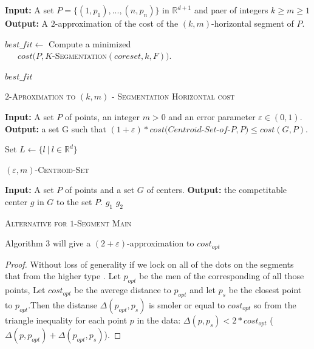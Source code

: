 \documentclass{vldb}
\begin{document}
\begin{algorithm}
\begin{algorithmic}
\STATE \textbf{Input:} A set $P = \lbrace(1,p_1),...,(n,p_n)\rbrace$ in $ \mathbb{R}^{d+1}$
and paer of integers $k\geq m\geq1$
\STATE \textbf{Output:} A $2$-approximation of the cost of the $(k,m)$-horizontal segment of $P$.
 
\STATE $best\_fit \gets $ Compute a minimized\\ \ \ \  $cost(P,$\textsc{$K$-Segmentation$(coreset,k,F)$}$)$.

\ENDFOR

\RETURN $best\_fit$



\caption{\textsc{$2$-Aproximation to $(k,m)$ - Segmentation Horizontal cost}}



\end{algorithmic}
\end{algorithm}
\begin{algorithm}
\begin{algorithmic}
\label{algthree}
\STATE \textbf{Input:} A set $P$ of points, an integer $m>0$ and an error parameter $\varepsilon\in (0,1)$. 
\STATE \textbf{Output:} a set G such that $(1+\varepsilon)*cost(Centroid$-$Set$-$of$-$P,P) \leq cost(G,P)$.

Set $L\gets \lbrace l\ \vert\ l \in \mathbb{R}^{d}     \rbrace$

\caption{\textsc{$(\varepsilon,m)$-Centroid-Set}}

\end{algorithmic}
\end{algorithm}


\begin{algorithm}
\begin{algorithmic}
\STATE \textbf{Input:} A set $P$ of points and a set $G$ of centers. 
\STATE \textbf{Output:} the competitable center $g$ in $G$ to the set $P$.
\RETURN $g_1$
\ELSE
\RETURN $g_2$
\ENDIF 

\caption{\textsc{Alternative for $1$-Segment Main}}

\end{algorithmic}
\end{algorithm}
\newtheorem{A}{Theorem}
\begin{theorem}
Algorithm 3 will give a 
$(2+\varepsilon)$-approximation to $cost_{opt}$


\end{theorem}
\begin{proof}
Without loss of generality
if we lock on all of the dots on the segments that from the higher type .
Let $p_{opt}$ be the men of the corresponding of all those points, Let $cost_{opt}$ be the averege distance to $p_{opt}$ and let $p_{s}$ be the closest point to $p_{opt}$.Then the distanse $\Delta(p_{opt},p_s)$ is smoler or equal to $cost_{opt}$ so from the triangle inequality for each point $p$ in the data: $\Delta(p,p_s)<2*cost_{opt}$ ($\Delta(p,p_{opt})+\Delta(p_{opt},p_s)$).

\end{proof}
\end{document}
